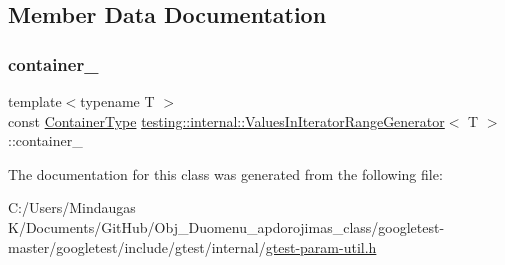 \subsection{Member Data Documentation}
\mbox{\label{classtesting_1_1internal_1_1_values_in_iterator_range_generator_ad2701e9149384e64b1b98da5d31eb7a4}} 
\subsubsection{\texorpdfstring{container\_}{container\_}}
{\footnotesize\ttfamily template$<$typename T $>$ \\
const \mbox{\hyperlink{classtesting_1_1internal_1_1_values_in_iterator_range_generator_afab6b799a125b471a8784ced9cf7335c}{Container\+Type}} \mbox{\hyperlink{classtesting_1_1internal_1_1_values_in_iterator_range_generator}{testing\+::internal\+::\+Values\+In\+Iterator\+Range\+Generator}}$<$ T $>$\+::container\+\_\+\hspace{0.3cm}{\ttfamily [private]}}



The documentation for this class was generated from the following file\+:\begin{DoxyCompactItemize}
\item 
C\+:/\+Users/\+Mindaugas K/\+Documents/\+Git\+Hub/\+Obj\+\_\+\+Duomenu\+\_\+apdorojimas\+\_\+class/googletest-\/master/googletest/include/gtest/internal/\mbox{\hyperlink{googletest-master_2googletest_2include_2gtest_2internal_2gtest-param-util_8h}{gtest-\/param-\/util.\+h}}\end{DoxyCompactItemize}
